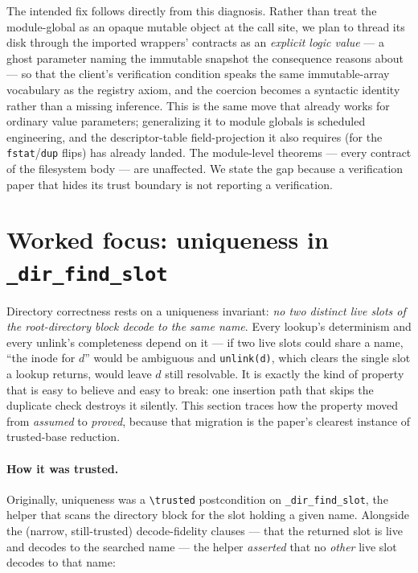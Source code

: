 \documentclass[11pt]{article}
\begin{document}
The intended fix follows directly from this diagnosis. Rather than treat the
module-global as an opaque mutable object at the call site, we plan to thread
its disk through the imported wrappers' contracts as an \emph{explicit logic
value} --- a ghost parameter naming the immutable snapshot the consequence
reasons about --- so that the client's verification condition speaks the same
immutable-array vocabulary as the registry axiom, and the coercion becomes a
syntactic identity rather than a missing inference. This is the same move that
already works for ordinary value parameters; generalizing it to module globals
is scheduled engineering, and the descriptor-table field-projection it also
requires (for the \texttt{fstat}/\texttt{dup} flips) has already landed. The
module-level theorems --- every contract of the filesystem body --- are
unaffected. We state the gap because a verification paper that hides its trust
boundary is not reporting a verification.

\section{Worked focus: uniqueness in \texttt{\_dir\_find\_slot}}
\label{sec:uniqueness}

Directory correctness rests on a uniqueness invariant: \emph{no two distinct
live slots of the root-directory block decode to the same name}. Every
lookup's determinism and every unlink's completeness depend on it --- if two
live slots could share a name, ``the inode for $d$'' would be ambiguous and
\texttt{unlink(d)}, which clears the single slot a lookup returns, would leave
$d$ still resolvable. It is exactly the kind of property that is easy to
believe and easy to break: one insertion path that skips the duplicate check
destroys it silently. This section traces how the property moved from
\emph{assumed} to \emph{proved}, because that migration is the paper's clearest
instance of trusted-base reduction.

\paragraph{How it was trusted.}
Originally, uniqueness was a \texttt{\textbackslash trusted} postcondition on
\texttt{\_dir\_find\_slot}, the helper that scans the directory block for the
slot holding a given name. Alongside the (narrow, still-trusted) decode-fidelity
clauses --- that the returned slot is live and decodes to the searched name ---
the helper \emph{asserted} that no \emph{other} live slot decodes to that name:
\end{document}
